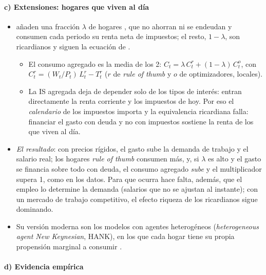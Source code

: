 \documentclass[11pt]{article}
\begin{document}
\paragraph{c) Extensiones: hogares que viven al día}

\begin{itemize}
\item \textcite{GaliLopezSalidoValles2007} añaden una fracción $\lambda$ de hogares , que no ahorran ni se endeudan y consumen cada periodo su renta neta de impuestos; el resto, $1-\lambda$, son ricardianos y siguen la ecuación de .
  \begin{itemize}
  \item El consumo agregado es la media de los 2: $C_t=\lambda\,C^r_t+(1-\lambda)\,C^o_t$, con $C^r_t=(W_t/P_t)\,L^r_t-T^r_t$ ($r$ de \emph{rule of thumb} y $o$ de optimizadores, locales).
  \item La IS agregada deja de depender solo de los tipos de interés: entran directamente la renta corriente y los impuestos de hoy. Por eso el \emph{calendario} de los impuestos importa y la equivalencia ricardiana falla: financiar el gasto con deuda y no con impuestos sostiene la renta de los que viven al día.
  \end{itemize}
\item \emph{El resultado}: con precios rígidos, el gasto sube la demanda de trabajo y el salario real; los hogares \emph{rule of thumb} consumen más, y, si $\lambda$ es alto y el gasto se financia sobre todo con deuda, el consumo agregado \emph{sube} y el multiplicador supera 1, como en los datos. Para que ocurra hace falta, además, que el empleo lo determine la demanda (salarios que no se ajustan al instante); con un mercado de trabajo competitivo, el efecto riqueza de los ricardianos sigue dominando.
\item Su versión moderna son los modelos con agentes heterogéneos (\emph{heterogeneous agent New Keynesian}, HANK), en los que cada hogar tiene su propia propensión marginal a consumir .
\end{itemize}

\paragraph{d) Evidencia empírica}
\end{document}
